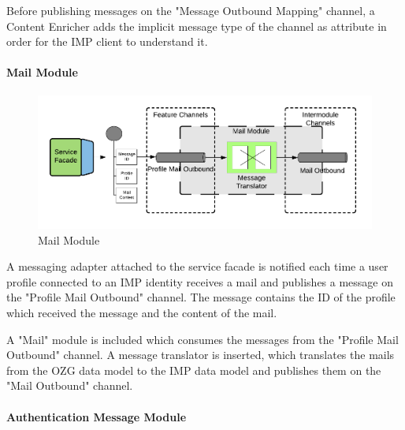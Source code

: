 Before publishing messages on the "Message Outbound Mapping" channel, a Content Enricher adds the implicit message type of the channel as attribute in order for the IMP client to understand it. 

\paragraph{Mail Module}

\begin{figure}[h!]
    \centering
    \includegraphics[scale=0.6]{Diagrams/Integration Architecture 1/Technological Integration/15. Mail Module.pdf}
    \caption{Mail Module}
    \label{integration1:mail_module}
\end{figure}


A messaging adapter attached to the service facade is notified each time a user profile connected to an IMP identity receives a mail and publishes a message on the "Profile Mail Outbound" channel. The message contains the ID of the profile which received the message and the content of the mail.

A "Mail" module is included which consumes the messages from the "Profile Mail Outbound" channel. A message translator is inserted, which translates the mails from the OZG data model to the IMP data model and publishes them on the "Mail Outbound" channel.

\paragraph{Authentication Message Module}

